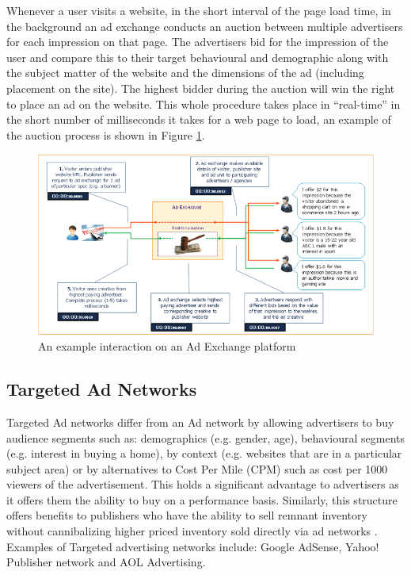 \documentclass{article}
\begin{document}
Whenever a user visits a website, in the short interval of the page load time, in the background an ad exchange conducts an auction between multiple advertisers for each impression on that page. The advertisers bid for the impression of the user and compare this to their target behavioural and demographic along with the subject matter of the website and the dimensions of the ad (including placement on the site). The highest bidder during the auction will win the right to place an ad on the website. This whole procedure takes place in ``real-time'' in the short number of milliseconds it takes for a web page to load, an example of the auction process is shown in Figure \ref{fig:adExchange}. 

\begin{figure}[H]
    \centering
    \includegraphics[width=1\textwidth]{adExchange}
    \caption{An example interaction on an Ad Exchange platform \parencite{adExchanges}}
    \label{fig:adExchange}
\end{figure}

\subsection{Targeted Ad Networks}
Targeted Ad networks differ from an Ad network by allowing advertisers to buy audience segments such as: demographics (e.g. gender, age),  behavioural segments (e.g. interest in buying a home), by context (e.g. websites that are in a particular subject area) or by alternatives to Cost Per Mile (CPM) such as cost per 1000 viewers of the advertisement. This holds a significant advantage to advertisers as it offers them the ability to buy on a performance basis. Similarly, this structure offers benefits to publishers who have the ability to sell remnant inventory without cannibalizing higher priced inventory sold directly via ad networks \parencite{adExchanges}. Examples of Targeted advertising networks include: Google AdSense, Yahoo! Publisher network and AOL Advertising. 
\end{document}
